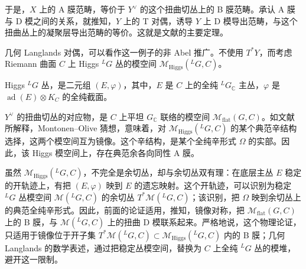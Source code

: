 于是，$X$ 上的 A 膜范畴，等价于 $Y^\vee$ 的这个扭曲切丛上的 B 膜范畴。承认 A 膜与 D 模之间的关系，就推知，$Y$ 上的 T 对偶，诱导 $Y$ 上 D 模导出范畴，与这个扭曲丛上的凝聚层导出范畴的等价。这就是文献的主要定理。

几何 Langlands 对偶，可以看作这一例子的非 Abel 推广。不使用 $T^*Y$，而考虑 Riemann 曲面 $C$ 上 Higgs ${}^LG$ 丛的模空间 $\mathcal{M}_{\mathrm{Higgs}}({}^LG,C)$。
\begin{definition*}[Higgs 丛]
Higgs ${}^LG$ 丛，是二元组 $(E,\varphi)$，其中，$E$ 是 $C$ 上的全纯 ${}^LG_{\mathbb C}$ 主丛，$\varphi$ 是 $\operatorname{ad}(E)\otimes K_C$ 的全纯截面。
\end{definition*}
$Y^\vee$ 的扭曲切丛的对应物，是 $C$ 上平坦 $G_{\mathbb C}$ 联络的模空间 $\mathcal{M}_{\mathrm{flat}}(G,C)$。如文献所解释，Montonen--Olive 猜想，意味着，对 $\mathcal{M}_{\mathrm{Higgs}}({}^LG,C)$ 的某个典范辛结构选择，这两个模空间互为镜像。这个辛结构，是某个全纯辛形式 $\Omega$ 的实部。因此，该 Higgs 模空间上，存在典范余各向同性 A 膜。

虽然 $\mathcal{M}_{\mathrm{Higgs}}({}^LG,C)$，不完全是余切丛，却与余切丛双有理：在底层主丛 $E$ 稳定的开轨迹上，有把 $(E,\varphi)$ 映到 $E$ 的遗忘映射。这个开轨迹，可以识别为稳定 ${}^LG$ 丛模空间 $\mathcal{M}({}^LG,C)$ 的余切丛 $T^*\mathcal{M}({}^LG,C)$；该识别，把 $\Omega$ 映到余切丛上的典范全纯辛形式。因此，前面的论证适用，推知，镜像对称，把 $\mathcal{M}_{\mathrm{flat}}(G,C)$ 上的 B 膜，与 $\mathcal{M}({}^LG,C)$ 上的扭曲 D 模联系起来。严格地说，这个物理论证，只适用于镜像位于开子集 $T^*\mathcal{M}({}^LG,C)\subset\mathcal{M}_{\mathrm{Higgs}}({}^LG,C)$ 内的 B 膜；几何 Langlands 的数学表述，通过把稳定丛模空间，替换为 $C$ 上全纯 ${}^LG$ 丛的模堆，避开这一限制。
